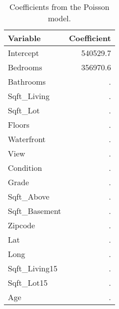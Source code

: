 \documentclass[a4paper, 8pt]{article}
\begin{document}
\begin{table}[ht]
\centering
\begin{tabular}{|l | r|}
\hline
\textbf{Variable} & \textbf{Coefficient} \\
\hline
Intercept     & 540529.7 \\
Bedrooms      & 356970.6 \\
Bathrooms     & . \\
Sqft\_Living   & . \\
Sqft\_Lot      & . \\
Floors        & . \\
Waterfront    & . \\
View          & . \\
Condition     & . \\
Grade         & . \\
Sqft\_Above    & . \\
Sqft\_Basement & . \\
Zipcode       & . \\
Lat           & . \\
Long          & . \\
Sqft\_Living15 & . \\
Sqft\_Lot15    & . \\
Age           & . \\
\hline
\end{tabular}
\caption{Coefficients from the Poisson model.}
\label{tab:mglm-coefs}
\end{table}


% 
% 
\end{document}
